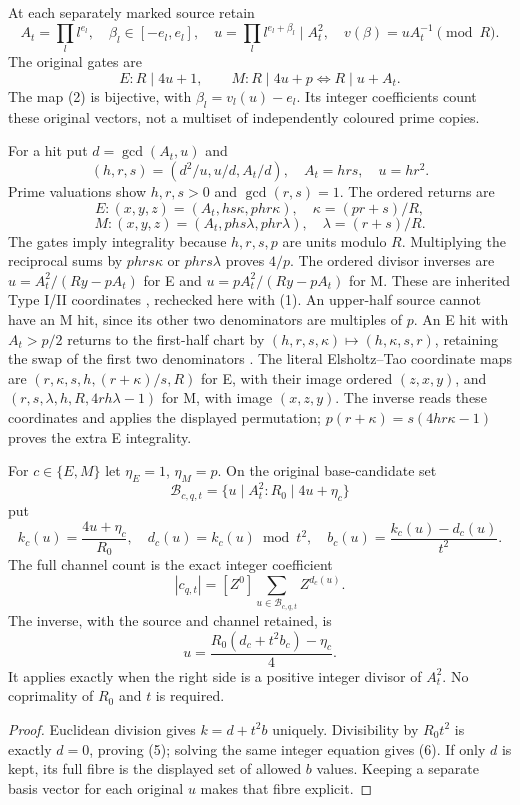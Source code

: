 At each separately marked source retain
\[
 A_t=\prod_l l^{e_l},\quad \beta_l\in[-e_l,e_l],\quad
 u=\prod_l l^{e_l+\beta_l}\mid A_t^2,\quad
 v(\beta)=uA_t^{-1}\pmod R.                             \tag{2}
\]
The original gates are
\[
 E:R\mid4u+1,\qquad M:R\mid4u+p\iff R\mid u+A_t.       \tag{3}
\]
The map (2) is bijective, with $\beta_l=v_l(u)-e_l$. Its integer coefficients count
these original vectors, not a multiset of independently coloured prime copies.

For a hit put $d=\gcd(A_t,u)$ and
\[
 (h,r,s)=(d^2/u,u/d,A_t/d),\quad A_t=hrs,\quad u=hr^2.
\]
Prime valuations show $h,r,s>0$ and $\gcd(r,s)=1$. The ordered returns are
\[
 E:(x,y,z)=(A_t,hs\kappa,phr\kappa),\quad\kappa=(pr+s)/R,
\]
\[
 M:(x,y,z)=(A_t,phs\lambda,phr\lambda),\quad\lambda=(r+s)/R. \tag{4}
\]
The gates imply integrality because $h,r,s,p$ are units modulo $R$.
Multiplying the reciprocal sums by $phrs\kappa$ or $phrs\lambda$ proves $4/p$.
The ordered divisor inverses are $u=A_t^2/(Ry-pA_t)$ for E and
$u=pA_t^2/(Ry-pA_t)$ for M. These are inherited Type I/II coordinates
\cite[\S2, Propositions 2.2 and 2.6]{ET}, rechecked here with (1).
An upper-half source cannot have an M hit, since its other two denominators
are multiples of $p$. An E hit with $A_t>p/2$ returns to the first-half chart
by $(h,r,s,\kappa)\mapsto(h,\kappa,s,r)$, retaining the swap of the first two
denominators \cite{Turn3}.
The literal Elsholtz--Tao coordinate maps are
$(r,\kappa,s,h,(r+\kappa)/s,R)$ for E, with their image ordered $(z,x,y)$,
and $(r,s,\lambda,h,R,4rh\lambda-1)$ for M, with image $(x,z,y)$.
The inverse reads these coordinates and applies the displayed permutation;
$p(r+\kappa)=s(4hr\kappa-1)$ proves the extra E integrality.

\begin{theorem}\label{thm:carry}
For $c\in\{E,M\}$ let $\eta_E=1$, $\eta_M=p$. On the original base-candidate set
\[
 \mathcal B_{c,q,t}=\{u\mid A_t^2:R_0\mid4u+\eta_c\}
\]
put
\[
 k_c(u)=\frac{4u+\eta_c}{R_0},\quad d_c(u)=k_c(u)\bmod t^2,\quad
 b_c(u)=\frac{k_c(u)-d_c(u)}{t^2}.
\]
The full channel count is the exact integer coefficient
\[
 \boxed{|c_{q,t}|=[Z^0]\sum_{u\in\mathcal B_{c,q,t}}Z^{d_c(u)}}. \tag{5}
\]
The inverse, with the source and channel retained, is
\[
 \boxed{u=\frac{R_0(d_c+t^2b_c)-\eta_c}{4}.}             \tag{6}
\]
It applies exactly when the right side is a positive integer divisor of $A_t^2$.
No coprimality of $R_0$ and $t$ is required.
\end{theorem}
\begin{proof}
Euclidean division gives $k=d+t^2b$ uniquely. Divisibility by $R_0t^2$ is exactly
$d=0$, proving (5); solving the same integer equation gives (6). If only $d$ is
kept, its full fibre is the displayed set of allowed $b$ values. Keeping a separate
basis vector for each original $u$ makes that fibre explicit.
\end{proof}

